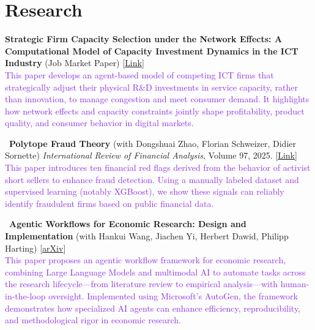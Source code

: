 \documentclass[a4paper,12pt]{article}
\begin{document}
\section{Research}

\textbullet \;\textbf{Strategic Firm Capacity Selection under the Network Effects: A Computational Model of Capacity Investment Dynamics in the ICT Industry} (Job Market Paper) [\href{https://drive.google.com/file/d/1wa6D0VgsMyzZHyDrStmR7gF94wcbUio_/view?usp=sharing}{Link}] \\ [1.5ex]
\textcolor{BlueViolet}{This paper develops an agent-based model of competing ICT firms that strategically adjust their physical R\&D investments in service capacity, rather than innovation, to manage congestion and meet consumer demand. It highlights how network effects and capacity constraints jointly shape profitability, product quality, and consumer behavior in digital markets.}

\textbullet\ \textbf{Polytope Fraud Theory} (with Dongshuai Zhao, Florian Schweizer, Didier Sornette) \textit{International Review of Financial Analysis}, Volume 97, 2025. [\href{https://www.sciencedirect.com/science/article/pii/S1057521924006665?via%3Dihub}{Link}] \\ [1.5ex]
\textcolor{BlueViolet}{This paper introduces ten financial red flags derived from the behavior of activist short sellers to enhance fraud detection. Using a manually labeled dataset and supervised learning (notably XGBoost), we show these signals can reliably identify fraudulent firms based on public financial data.}

\textbullet\ \textbf{Agentic Workflows for Economic Research: Design and Implementation} (with Hankui Wang, Jiachen Yi, Herbert Dawid, Philipp Harting) [\href{https://arxiv.org/abs/2504.09736}{arXiv}]\\ [1.5ex]
\textcolor{BlueViolet}{This paper proposes an agentic workflow framework for economic research, combining Large Language Models and multimodal AI to automate tasks across the research lifecycle—from literature review to empirical analysis—with human-in-the-loop oversight. Implemented using Microsoft’s AutoGen, the framework demonstrates how specialized AI agents can enhance efficiency, reproducibility, and methodological rigor in economic research.}
\end{document}
